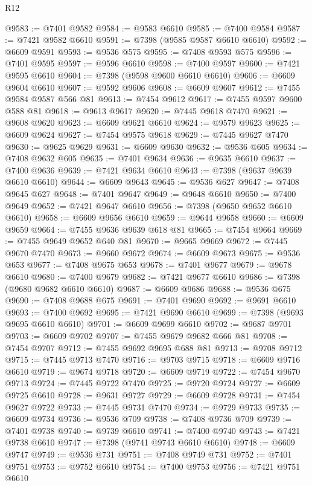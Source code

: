 \begin{lexlean}{R12}
\begin{coremodule}
{{{{{{{{{{{{{{{{{{{{{{{{{{{{{{{{{{{{{{{{{{{{{{{{{{{{{{{{{{{{{{{{{{{{{{{{{{{{{{{{{{@9583 := @7401 @9582
@9584 := @9583 @6610
@9585 := @7400 @9584
@9587 := @7421 @9582 @6610
@9591 := @7398 (@9585 @9587 @6610 @6610)
@9592 := @6609 @9591
@9593 := @9536 @575
@9595 := @7408 @9593 @575
@9596 := @7401 @9595
@9597 := @9596 @6610
@9598 := @7400 @9597
@9600 := @7421 @9595 @6610
@9604 := @7398 (@9598 @9600 @6610 @6610)
@9606 := @6609 @9604 @6610
@9607 := @9592 @9606
@9608 := @6609 @9607
@9612 := @7455 @9584 @9587 @566 @81
@9613 := @7454 @9612
@9617 := @7455 @9597 @9600 @588 @81
@9618 := @9613 @9617
@9620 := @7445 @9618 @7470
@9621 := @9608 @9620
@9623 := @6609 @9621 @6610
@9624 := @9579 @9623
@9625 := @6609 @9624
@9627 := @7454 @9575 @9618
@9629 := @7445 @9627 @7470
@9630 := @9625 @9629
@9631 := @6609 @9630
@9632 := @9536 @605
@9634 := @7408 @9632 @605
@9635 := @7401 @9634
@9636 := @9635 @6610
@9637 := @7400 @9636
@9639 := @7421 @9634 @6610
@9643 := @7398 (@9637 @9639 @6610 @6610)
@9644 := @6609 @9643
@9645 := @9536 @627
@9647 := @7408 @9645 @627
@9648 := @7401 @9647
@9649 := @9648 @6610
@9650 := @7400 @9649
@9652 := @7421 @9647 @6610
@9656 := @7398 (@9650 @9652 @6610 @6610)
@9658 := @6609 @9656 @6610
@9659 := @9644 @9658
@9660 := @6609 @9659
@9664 := @7455 @9636 @9639 @618 @81
@9665 := @7454 @9664
@9669 := @7455 @9649 @9652 @640 @81
@9670 := @9665 @9669
@9672 := @7445 @9670 @7470
@9673 := @9660 @9672
@9674 := @6609 @9673
@9675 := @9536 @653
@9677 := @7408 @9675 @653
@9678 := @7401 @9677
@9679 := @9678 @6610
@9680 := @7400 @9679
@9682 := @7421 @9677 @6610
@9686 := @7398 (@9680 @9682 @6610 @6610)
@9687 := @6609 @9686
@9688 := @9536 @675
@9690 := @7408 @9688 @675
@9691 := @7401 @9690
@9692 := @9691 @6610
@9693 := @7400 @9692
@9695 := @7421 @9690 @6610
@9699 := @7398 (@9693 @9695 @6610 @6610)
@9701 := @6609 @9699 @6610
@9702 := @9687 @9701
@9703 := @6609 @9702
@9707 := @7455 @9679 @9682 @666 @81
@9708 := @7454 @9707
@9712 := @7455 @9692 @9695 @688 @81
@9713 := @9708 @9712
@9715 := @7445 @9713 @7470
@9716 := @9703 @9715
@9718 := @6609 @9716 @6610
@9719 := @9674 @9718
@9720 := @6609 @9719
@9722 := @7454 @9670 @9713
@9724 := @7445 @9722 @7470
@9725 := @9720 @9724
@9727 := @6609 @9725 @6610
@9728 := @9631 @9727
@9729 := @6609 @9728
@9731 := @7454 @9627 @9722
@9733 := @7445 @9731 @7470
@9734 := @9729 @9733
@9735 := @6609 @9734
@9736 := @9536 @709
@9738 := @7408 @9736 @709
@9739 := @7401 @9738
@9740 := @9739 @6610
@9741 := @7400 @9740
@9743 := @7421 @9738 @6610
@9747 := @7398 (@9741 @9743 @6610 @6610)
@9748 := @6609 @9747
@9749 := @9536 @731
@9751 := @7408 @9749 @731
@9752 := @7401 @9751
@9753 := @9752 @6610
@9754 := @7400 @9753
@9756 := @7421 @9751 @6610
}}}}}}}}}}}}}}}}}}}}}}}}}}}}}}}}}}}}}}}}}}}}}}}}}}}}}}}}}}}}}}}}}}}}}}}}}}}}}}}}}}
\end{coremodule}
\end{lexlean}
